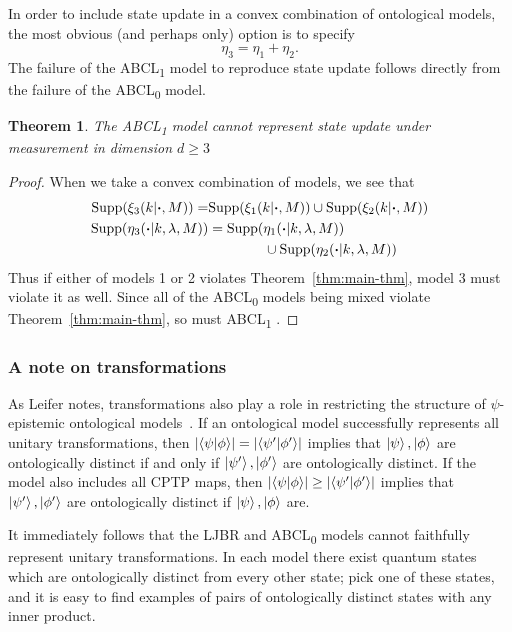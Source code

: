 \documentclass[%
 reprint, onecolumn, 12pt,
superscriptaddress,
nofootinbib,
 prx, 
]{quantumarticle}
\newtheorem{theorem}{Theorem}
\newcommand{\supp}{\textup{Supp}}
\newcommand{\abclz}{{ABCL\textsubscript{0}} }
\newcommand{\abclo}{{ABCL\textsubscript{1}} }
\begin{document}
In order to include state update in a convex combination of
ontological models, the most obvious (and perhaps only) option is to
specify
\begin{equation}
  \eta_3=\eta_1+\eta_2.
\end{equation}
The failure of the \abclo model to reproduce state update follows
directly from the failure of the \abclz model.
\begin{theorem}
  The \abclo model cannot represent state update under measurement in
  dimension $d\geq3$
\end{theorem}
\begin{proof}
  When we take a convex combination of models, we see that
  \begin{align*}
    \supp(\xi_3(k|\vdot,M))           = &\supp(\xi_1(k|\vdot,M)) \cup \supp(\xi_2(k|\vdot,M)) \\
    \supp(\eta_3(\vdot|k,\lambda,M)) & =\supp(\eta_1(\vdot|k,\lambda,M))                      \\
                                     & \qquad\qquad\cup \supp(\eta_2(\vdot|k,\lambda,M))
  \end{align*}
  Thus if either of models 1 or 2 violates Theorem~\ref{thm:main-thm},
  model 3 must violate it as well.  Since all of the \abclz models
  being mixed violate Theorem~\ref{thm:main-thm}, so must \abclo.
\end{proof}



\subsubsection{A note on transformations}

As Leifer notes, transformations also play a role in restricting the
structure of $\psi$-epistemic ontological models~\cite[Section
8.1]{Leiferquantumstatereal2014}. If an ontological model successfully
represents all unitary transformations, then
$\left|\braket{\psi}{\phi}\right|=\left|\braket{\psi'}{\phi'}\right|$
implies that $\ket\psi,\ket\phi$ are ontologically distinct if and
only if $\ket{\psi'},\ket{\phi'}$ are ontologically distinct. If the
model also includes all CPTP maps, then
$\left|\braket{\psi}{\phi}\right|\geq\left|\braket{\psi'}{\phi'}\right|$
implies that $\ket{\psi'},\ket{\phi'}$ are ontologically distinct if
$\ket\psi,\ket\phi$ are.

It immediately follows that the LJBR and \abclz models cannot
faithfully represent unitary transformations. In each model there
exist quantum states which are ontologically distinct from every other
state; pick one of these states, and it is easy to find examples of
pairs of ontologically distinct states with any inner product.
\end{document}
